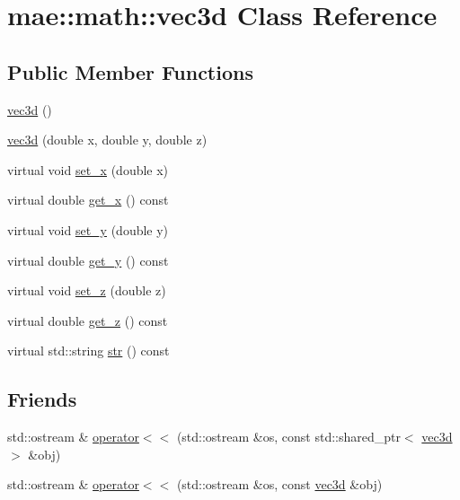 \hypertarget{classmae_1_1math_1_1vec3d}{\section{mae\-:\-:math\-:\-:vec3d Class Reference}
\label{classmae_1_1math_1_1vec3d}
}
\subsection*{Public Member Functions}
\begin{DoxyCompactItemize}
\item 
\hyperlink{classmae_1_1math_1_1vec3d_a765884440bd75fb021f82a0b08342993}{vec3d} ()
\item 
\hyperlink{classmae_1_1math_1_1vec3d_a54c773be8273c8462df6ae790528ad90}{vec3d} (double x, double y, double z)
\item 
virtual void \hyperlink{classmae_1_1math_1_1vec3d_af152b95813c55f7136cd876df08da688}{set\-\_\-x} (double x)
\item 
virtual double \hyperlink{classmae_1_1math_1_1vec3d_a5ece2226e5d958b7d194b7011523cb45}{get\-\_\-x} () const 
\item 
virtual void \hyperlink{classmae_1_1math_1_1vec3d_acc4c161f86f5accfc477dc4eaa495477}{set\-\_\-y} (double y)
\item 
virtual double \hyperlink{classmae_1_1math_1_1vec3d_a42d97fc5d73175e3b48f3754491e2bbb}{get\-\_\-y} () const 
\item 
virtual void \hyperlink{classmae_1_1math_1_1vec3d_a2f447c43b1cce7f1e9d92a4a0632ff82}{set\-\_\-z} (double z)
\item 
virtual double \hyperlink{classmae_1_1math_1_1vec3d_a9597a58bdb1692d0a96bdb6e1368255e}{get\-\_\-z} () const 
\item 
virtual std\-::string \hyperlink{classmae_1_1math_1_1vec3d_a686b7876881d3ffa6c51f9a538998c4a}{str} () const 
\end{DoxyCompactItemize}
\subsection*{Friends}
\begin{DoxyCompactItemize}
\item 
std\-::ostream \& \hyperlink{classmae_1_1math_1_1vec3d_a0639044d670a12dc86ce762c3370c731}{operator$<$$<$} (std\-::ostream \&os, const std\-::shared\-\_\-ptr$<$ \hyperlink{classmae_1_1math_1_1vec3d}{vec3d} $>$ \&obj)
\item 
std\-::ostream \& \hyperlink{classmae_1_1math_1_1vec3d_ab9143424a170891e76f764d1307d48e0}{operator$<$$<$} (std\-::ostream \&os, const \hyperlink{classmae_1_1math_1_1vec3d}{vec3d} \&obj)
\end{DoxyCompactItemize}


